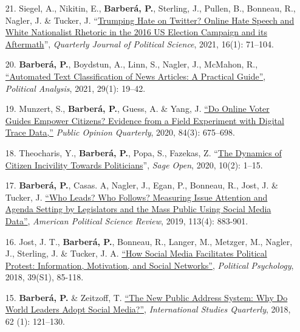 \documentclass[margin,line,11pt]{resume}
\begin{document}
\begin{resume}
\begin{itemize}[leftmargin=5.5mm]
\item[21.] Siegel, A., Nikitin, E., \textbf{Barber\'{a}, P.}, Sterling, J., Pullen, B., Bonneau, R., Nagler, J. \& Tucker, J. ``\href{http://dx.doi.org/10.1561/100.00019045}{Trumping Hate on Twitter? Online Hate Speech and White Nationalist Rhetoric in the 2016 US Election Campaign and its Aftermath}'', \textit{Quarterly Journal of Political Science}, 2021, 16(1): 71--104.

\item[20.] \textbf{Barber\'{a}, P.}, Boydstun, A., Linn, S., Nagler, J., McMahon, R.,  \href{https://www.cambridge.org/core/journals/political-analysis/article/automated-text-classification-of-news-articles-a-practical-guide/10462DB284B1CD80C0FAE796AD786BC6}{``Automated Text Classification of News Articles: A Practical Guide''}, \textit{Political Analysis}, 2021, 29(1): 19--42.

\item[19.] Munzert, S., \textbf{Barber\'{a}, P.}, Guess, A. \& Yang, J. \href{https://academic.oup.com/poq/advance-article/doi/10.1093/poq/nfaa037/6104133}{``Do Online Voter Guides Empower Citizens? Evidence from a Field Experiment with Digital Trace Data,''} \textit{Public Opinion Quarterly}, 2020, 84(3): 675--698.

\item[18.] Theocharis, Y., \textbf{Barber\'{a}, P.}, Popa, S., Fazekas, Z. ``\href{https://journals.sagepub.com/doi/full/10.1177/2158244020919447}{The Dynamics of Citizen Incivility Towards Politicians}'', \textit{Sage Open}, 2020, 10(2): 1--15.

\item[17.] \textbf{Barber\'{a}, P.}, Casas. A, Nagler, J., Egan, P., Bonneau, R., Jost, J. \& Tucker, J. \href{https://t.co/6KnjCczsqH}{``Who Leads? Who Follows? Measuring Issue Attention and Agenda Setting by Legislators and the Mass Public Using Social Media Data''}, \textit{American Political Science Review}, 2019, 113(4): 883-901.

\newpage   

\item[16.] Jost, J. T., \textbf{Barber\'{a}, P.}, Bonneau, R., Langer, M., Metzger, M., Nagler, J., Sterling, J. \& Tucker, J. A. \href{http://onlinelibrary.wiley.com/doi/10.1111/pops.12478/full}{``How Social Media Facilitates Political Protest: Information, Motivation, and Social Networks''}, \textit{Political Psychology}, 2018, 39(S1), 85-118.

\item[15.] \textbf{Barber\'{a}, P.} \& Zeitzoff, T. \href{https://academic.oup.com/isq/article/doi/10.1093/isq/sqx047/4430887/The-New-Public-Address-System-Why-Do-World-Leaders}{``The New Public Address System: Why Do World Leaders Adopt Social Media?''}, \textit{International Studies Quarterly}, 2018, 62 (1): 121--130.
    

\end{itemize}
\end{resume}
\end{document}
